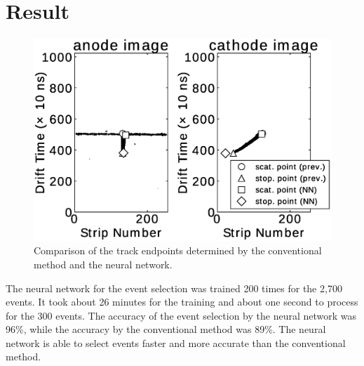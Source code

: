 \documentclass{jps-cp}
\begin{document}
\section{Result}
\begin{figure}
  \vspace{-3zw}
  \centering
  \includegraphics[clip, width=25zw]{eps/compare_mono_v4.eps}
  \caption{Comparison of the track endpoints determined by the conventional method and the neural network.}
  \label{fig:result_detection}
  \vspace{-2zw}
\end{figure}

The neural network for the event selection was trained 200 times for the 2,700 events.
It took about 26 minutes for the training and about one second to process for the 300 events.
The accuracy of the event selection by the neural network was 96\%,
while the accuracy by the conventional method was 89\%.
The neural network is able to select events faster and more accurate than the conventional method.

\end{document}
